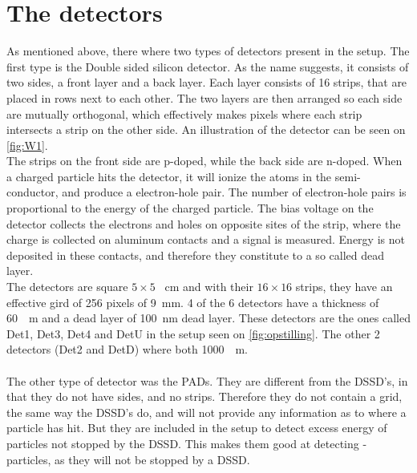 \section{The detectors}
As mentioned above, there where two types of detectors present in the setup. The first type is the Double sided silicon detector. 
As the name suggests, it consists of two sides, a front layer and a back layer. Each layer consists of 16 strips, that are placed in rows next to each other. The two layers are then arranged so each side are mutually orthogonal, which effectively makes pixels where each strip intersects a strip on the other side. An illustration of the detector can be seen on \cref{fig:W1}.\\
The strips on the front side are p-doped, while the back side are n-doped. When a charged particle hits the detector, it will ionize the atoms in the semi-conductor, and produce a electron-hole pair. The number of electron-hole pairs is proportional to the energy of the charged particle. 
The bias voltage on the detector collects the electrons and holes on opposite sites of the strip, where the charge is collected on aluminum contacts and a signal is measured. Energy is not deposited in these contacts, and therefore they constitute to a so called dead layer. \\
The detectors are square $5\times 5$ \SI{}{cm} and with their $16\times 16$ strips, they have an effective gird of  256 pixels of \SI{9}{mm}. 
4 of the 6 detectors have a thickness of \SI{60}{\mu m} and a dead layer of \SI{100}{nm} dead layer. These detectors are the ones called Det1, Det3, Det4 and DetU in the setup seen on \cref{fig:opstilling}. The other 2 detectors (Det2 and DetD) where both \SI{1000}{\mu m}.
\\
\\
The other type of detector was the PADs. They are different from the DSSD's, in that they do not have sides, and no strips. Therefore they do not contain a grid, the same way the DSSD's do, and will not provide any information as to where a particle has hit. But they are included in the setup to detect excess energy of particles not stopped by the DSSD. This makes them good at detecting \be-particles, as they will not be stopped by a DSSD.


